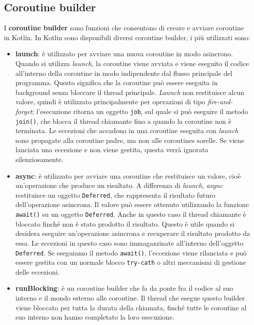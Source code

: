 \documentclass[12pt,a4paper,openright,twoside]{book}
\begin{document}
\subsection{Coroutine builder}
I \textbf{coroutine builder} sono funzioni che consentono di creare e avviare coroutine in Kotlin. In Kotlin sono disponibili diversi coroutine builder, i più utilizzati sono:
\begin{itemize}
    \item \textbf{launch}: è utilizzato per avviare una nuova coroutine in modo asincrono. Quando si utilizza \textit{launch}, la coroutine viene avviata e viene eseguito il codice all'interno della coroutine in modo indipendente dal flusso principale del programma. Questo significa che la coroutine può essere eseguita in background senza bloccare il thread principale.
    \textit{Launch} non restituisce alcun valore, quindi è utilizzato principalmente per operazioni di tipo \textit{fire-and-forget}; 
    l'esecuzione ritorna un oggetto \texttt{job}, sul quale si può eseguire il metodo \texttt{join()}, che blocca il thread chiamante fino a quando la coroutine non è terminata. 
    Le eccezioni che accadono in una coroutine eseguita con \textit{launch} sono propagate alla coroutine padre, ma non alle coroutines sorelle. Se viene lanciata una eccezione e non viene gestita, questa verrà ignorata silenziosamente. 
    \item \textbf{async}: è utilizzato per avviare una coroutine che restituisce un valore, cioè un'operazione che produce un risultato. A differenza di \textit{launch}, \textit{async} restituisce un oggetto \texttt{Deferred}, che rappresenta il risultato futuro dell'operazione asincrona. Il valore può essere ottenuto utilizzando la funzione \texttt{await()} su un oggetto \texttt{Deferred}. Anche in questo caso il thread chiamante è bloccato finché non è stato prodotto il risultato. 
    Questo è utile quando si desidera eseguire un'operazione asincrona e recuperare il risultato prodotto da essa.
    Le eccezioni in questo caso sono immagazzinate all'interno dell'oggetto \texttt{Deferred}. Se eseguiamo il metodo \texttt{await()}, l'eccezione viene rilanciata e può essere gestita con un normale blocco \texttt{try-cath} o altri meccanismi di gestione delle eccezioni. 
    \item \textbf{runBlocking}: è un coroutine builder che fa da ponte fra il codice al suo interno e il mondo esterno alle coroutine. Il thread che esegue questo builder viene bloccato per tutta la durata della chiamata, finché tutte le coroutine al suo interno non hanno completato la loro esecuzione. 
\end{itemize}
\end{document}
